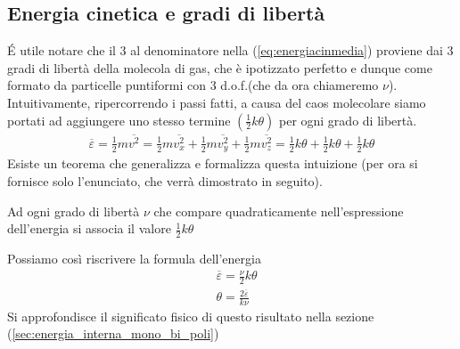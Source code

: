 \documentclass[
10pt, %
a4paper, %
oneside, %
headinclude,footinclude, %
BCOR5mm, %
]{scrartcl}
\begin{document}
\subsection{Energia cinetica e gradi di libertà}\label{sec:energiacinetica_d.o.f.}
\'{E} utile notare che il 3 al denominatore nella (\ref{eq:energiacinmedia}) proviene dai 3 gradi di libertà della molecola di gas, che è ipotizzato perfetto e dunque come formato da particelle puntiformi con 3 d.o.f.(che da ora chiameremo $\nu$). Intuitivamente, ripercorrendo i passi fatti, a causa del caos molecolare siamo portati ad aggiungere uno stesso termine \((\frac{1}{2}k\theta)\) per ogni grado di libertà. 
\begin{align*} 
	\overline{\varepsilon} = \frac{1}{2}m\overline{ v^2} = \frac{1}{2}m\overline{ v_x^2}+\frac{1}{2}m\overline{ v_y^2}+\frac{1}{2}m\overline{ v_z^2} = \frac{1}{2}k\theta+\frac{1}{2}k\theta+\frac{1}{2}k\theta
\end{align*}  
Esiste un teorema che generalizza e formalizza questa intuizione (per ora si fornisce solo l'enunciato, che verrà dimostrato in seguito).
\begin{theorem}
	Ad ogni grado di libertà $\nu$ che compare quadraticamente nell'espressione dell'energia si associa il valore \(\frac{1}{2}k\theta\)
\end{theorem}
Possiamo così riscrivere la formula dell'energia
\begin{align}\label{eq:energiacinetica_d.o.f.}
	&\overline{\varepsilon} = \frac{\nu}{2} k \theta\\
	&\theta = \frac{2 \overline{\varepsilon}}{k \nu}\nonumber
\end{align} 
Si approfondisce il significato fisico di questo risultato nella sezione (\ref{sec:energia_interna_mono_bi_poli})
\end{document}
